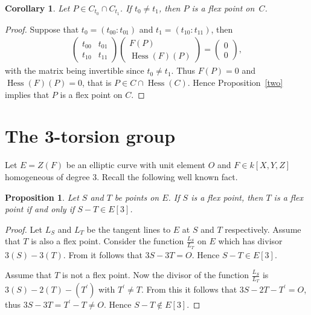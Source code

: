 \documentclass[11pt]{article}
\newcommand{\msetp}[1]{{\left({#1}\right)}}					%
\newcommand{\msets}[1]{{\left[{#1}\right]}}					%
\newcommand{\mhess}[1]{\operatorname{Hess}\msetp{#1}}			%
\numberwithin{equation}{section}
\newtheorem{Corollary}[Theorem]{Corollary}
\newtheorem{Proposition}[Theorem]{Proposition}
\begin{document}
\begin{Corollary}\label{hpga:cor:cphpfp}
Let $P\in C_{t_0}\cap C_{t_1}$. If $t_0\neq t_1$, then $P$ is a flex point on~$C$.
\end{Corollary}
\begin{proof}
Suppose that $t_0=\msetp{t_{00}:t_{01}}$ and $t_1=\msetp{t_{10}:t_{11}}$, then
\begin{gather*}
\begin{pmatrix}
t_{00} & t_{01} \\
t_{10} & t_{11}
\end{pmatrix}
\begin{pmatrix}
F\msetp{P} \\
\mhess{F}\msetp{P}
\end{pmatrix}
=
\begin{pmatrix}
0 \\
0
\end{pmatrix},
\end{gather*}
with the matrix being invertible since $t_0\neq t_1$. Thus $F\msetp{P}=0$ and $\mhess{F}\msetp{P}=0$, that is $P\in C\cap\mhess{C}$. Hence Proposition~\ref{two} implies that $P$ is a flex point on $C$.
\end{proof}

\section{The 3-torsion group}\label{hpga:sec:3tgrp}

Let $E=Z\msetp{F}$ be an elliptic curve with unit element $O$ and $F\in k\msets {X,Y,Z}$ homogeneous of degree 3. Recall the following well known fact.

\begin{Proposition}Let $S$ and $T$ be points on $E$. If $S$ is a flex point, then $T$ is a flex point if and only if $S-T\in E\msets{3}$.
\end{Proposition}
\begin{proof}Let $L_S$ and $L_T$ be the tangent lines to $E$ at $S$ and $T$ respectively. Assume that $T$ is also a flex point. Consider the function $\frac{L_S}{L_T}$ on $E$ which has divisor $3\msetp{S}-3\msetp{T}$. From \cite[Corollary~III.3.5]{silverman1985} it follows that $3S-3T=O$. Hence $S-T\in E\msets{3}$.

Assume that $T$ is not a flex point. Now the divisor of the function $\frac {L_S}{L_T}$ is $3\msetp{S}-2\msetp{T}-\msetp{T^\prime}$ with $T^\prime\neq T$. From this it follows that $3S-2T-T^\prime=O$, thus $3S-3T=T^\prime-T\neq O$. Hence $S-T\notin E\msets{3}$.
\end{proof}
\end{document}
